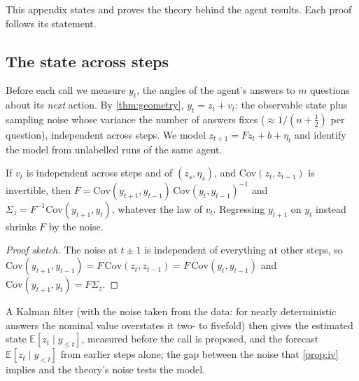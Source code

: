 \label{app:agents}
This appendix states and proves the theory behind the agent results. Each proof follows its statement.

\subsection{The state across steps}
Before each call we measure $y_t$, the angles of the agent's answers to $m$ questions about its \emph{next} action. By \cref{thm:geometry}, $y_t=z_t+v_t$: the observable state plus sampling noise whose variance the number of answers fixes ($\approx1/(n+\frac12)$ per question), independent across steps. We model $z_{t+1}=Fz_t+b+\eta_t$ and identify the model from unlabelled runs of the same agent.
\begin{proposition}\label{prop:iv}
If $v_t$ is independent across steps and of $(z_s,\eta_s)$, and $\mathrm{Cov}(z_t,z_{t-1})$ is invertible, then $F=\mathrm{Cov}(y_{t+1},y_{t-1})\,\mathrm{Cov}(y_t,y_{t-1})^{-1}$ and $\Sigma_z=F^{-1}\mathrm{Cov}(y_{t+1},y_t)$, whatever the law of $v_t$. Regressing $y_{t+1}$ on $y_t$ instead shrinks $F$ by the noise.
\end{proposition}
\begin{proof}[Proof sketch]
The noise at $t\pm1$ is independent of everything at other steps, so $\mathrm{Cov}(y_{t+1},y_{t-1})=F\,\mathrm{Cov}(z_t,z_{t-1})=F\,\mathrm{Cov}(y_t,y_{t-1})$ and $\mathrm{Cov}(y_{t+1},y_t)=F\Sigma_z$.
\end{proof}
A Kalman filter (with the noise taken from the data: for nearly deterministic answers the nominal value overstates it two- to fivefold) then gives the estimated state $\mathbb{E}[z_t\mid y_{\le t}]$, measured before the call is proposed, and the forecast $\mathbb{E}[z_t\mid y_{<t}]$ from earlier steps alone; the gap between the noise that \cref{prop:iv} implies and the theory's noise tests the model.



